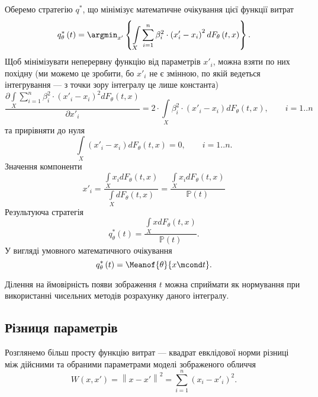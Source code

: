 Оберемо стратегію $q^*$,
що мінімізує математичне очікування цієї функції витрат
\begin{equation*}
  q^*_{\theta}\left( t \right)
  = \argmin_{x'} \left\{
    \int\limits_{X}
        \sum_{i = 1}^n \beta_i^2 \cdot \left( x'_i - x_i \right)^2
        dF_{\theta}\left( t, x \right)
    \right\}.
\end{equation*}
Щоб мінімізувати неперервну функцію від параметрів $x'_i$,
можна взяти по них похідну
(ми можемо це зробити, бо $x'_i$ не є змінною,
по якій ведеться інтегрування --- з точки зору інтегралу це лише константа)
\begin{equation*}
  \frac{\partial \int\limits_{X}
      \sum\limits_{i = 1}^n \beta_i^2 \cdot \left( x'_i - x_i \right)^2
      dF_{\theta}\left( t, x \right)
  }{\partial x'_i}
  = 2 \cdot \int\limits_{X}
    \beta_i^2 \cdot \left( x'_i - x_i \right) dF_{\theta}\left( t, x \right),
    \qquad i = 1..n
\end{equation*}
та прирівняти до нуля
\begin{equation*}
  \int\limits_{X} \left( x'_i - x_i \right) dF_{\theta}\left( t, x \right) = 0,
  \qquad i = 1..n.
\end{equation*}
Значення компоненти
\begin{equation*}
  x'_i
  = \frac{\int\limits_{X} x_i dF_{\theta}\left( t, x \right)}
         {\int\limits_{X} dF_{\theta}\left( t, x \right)}
  = \frac{\int\limits_{X} x_i dF_{\theta}\left( t, x \right)}
         {\mathbb{P}\left( t \right)}
\end{equation*}
Результуюча стратегія
\begin{equation*}
  q^*_{\theta}\left( t \right)
  = \frac{\int\limits_{X} x dF_{\theta}\left( t, x \right)}{\mathbb{P}\left( t \right)}.
\end{equation*}
У вигляді умовного математичного очікування
\begin{equation*}
  q^*_{\theta}\left( t \right) = \Meanof{\theta}{x \mcond t}.
\end{equation*}

Ділення на ймовірність появи зображення $t$ можна сприймати як нормування
при використанні чисельних методів розрахунку даного інтегралу.

\subsection{Різниця параметрів}

Розглянемо більш просту функцію витрат ---
квадрат евклідової норми різниці між дійсними та обраними параметрами
моделі зображеного обличчя
\begin{equation*}
  W \left( x, x' \right)
  = \left\| x - x' \right\|^2
  = \sum_{i = 1}^n \left( x_i - x'_i \right)^2.
\end{equation*}

